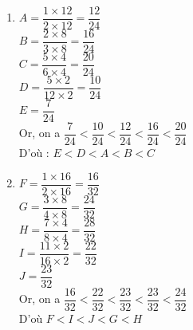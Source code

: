    \ \\ [-5mm]
   \begin{enumerate}
      \item $A =\dfrac{1\times12}{2\times12} =\dfrac{12}{24}$ \\ [2mm]
         $B =\dfrac{2\times8}{3\times8} =\dfrac{16}{24}$ \\ [2mm]
         $C =\dfrac{5\times4}{6\times4} =\dfrac{20}{24}$ \\ [2mm]
         $D = \dfrac{5\times2}{12\times2} =\dfrac{10}{24}$ \\ [2mm]
         $E =\dfrac{7}{24}$ \\ [2mm]
         Or, on a $\dfrac{7}{24}<\dfrac{10}{24}<\dfrac{12}{24}<\dfrac{16}{24}<\dfrac{20}{24}$ \\ [2mm]
         D'où : {\blue $E<D<A<B<C$} \\ [2mm]
      \item $F =\dfrac{1\times16}{2\times16} =\dfrac{16}{32}$ \\ [2mm]
         $G =\dfrac{3\times8}{4\times8} =\dfrac{24}{32}$ \\ [2mm]
         $H =\dfrac{7\times4}{8\times4} =\dfrac{28}{32}$ \\ [2mm]
         $I = \dfrac{11\times2}{16\times2} =\dfrac{22}{32}$ \\ [2mm]
         $J =\dfrac{23}{32}$ \\ [2mm]
         Or, on a $\dfrac{16}{32}<\dfrac{22}{32}<\dfrac{23}{32}<\dfrac{23}{32}<\dfrac{24}{32}$ \\ [2mm]
         D'où {\blue $F<I<J<G<H$}
   \end{enumerate}
